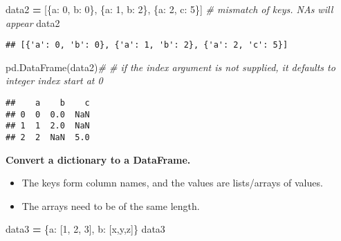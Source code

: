 \documentclass[
]{book}
\newenvironment{Shaded}{\begin{snugshade}}{\end{snugshade}}
\newcommand{\CommentTok}[1]{\textcolor[rgb]{0.56,0.35,0.01}{\textit{#1}}}
\newcommand{\DecValTok}[1]{\textcolor[rgb]{0.00,0.00,0.81}{#1}}
\newcommand{\NormalTok}[1]{#1}
\newcommand{\OperatorTok}[1]{\textcolor[rgb]{0.81,0.36,0.00}{\textbf{#1}}}
\newcommand{\StringTok}[1]{\textcolor[rgb]{0.31,0.60,0.02}{#1}}
\begin{document}
\begin{Shaded}
\begin{Highlighting}[]
\NormalTok{data2 }\OperatorTok{=}\NormalTok{ [\{}\StringTok{\textquotesingle{}a\textquotesingle{}}\NormalTok{: }\DecValTok{0}\NormalTok{, }\StringTok{\textquotesingle{}b\textquotesingle{}}\NormalTok{: }\DecValTok{0}\NormalTok{\},}
\NormalTok{\{}\StringTok{\textquotesingle{}a\textquotesingle{}}\NormalTok{: }\DecValTok{1}\NormalTok{, }\StringTok{\textquotesingle{}b\textquotesingle{}}\NormalTok{: }\DecValTok{2}\NormalTok{\},}
\NormalTok{\{}\StringTok{\textquotesingle{}a\textquotesingle{}}\NormalTok{: }\DecValTok{2}\NormalTok{, }\StringTok{\textquotesingle{}c\textquotesingle{}}\NormalTok{: }\DecValTok{5}\NormalTok{\}] }\CommentTok{\# mismatch of keys. NAs will appear}
\NormalTok{data2}
\end{Highlighting}
\end{Shaded}

\begin{verbatim}
## [{'a': 0, 'b': 0}, {'a': 1, 'b': 2}, {'a': 2, 'c': 5}]
\end{verbatim}

\begin{Shaded}
\begin{Highlighting}[]
\NormalTok{pd.DataFrame(data2)}\CommentTok{\# \# if the index argument is not supplied, it defaults to integer index start at 0}
\end{Highlighting}
\end{Shaded}

\begin{verbatim}
##    a    b    c
## 0  0  0.0  NaN
## 1  1  2.0  NaN
## 2  2  NaN  5.0
\end{verbatim}

\textbf{Convert a dictionary to a DataFrame.}

\begin{itemize}
\item
  The keys form column names, and the values are lists/arrays of values.
\item
  The arrays need to be of the same length.
\end{itemize}

\begin{Shaded}
\begin{Highlighting}[]
\NormalTok{data3 }\OperatorTok{=}\NormalTok{ \{}\StringTok{\textquotesingle{}a\textquotesingle{}}\NormalTok{: [}\DecValTok{1}\NormalTok{, }\DecValTok{2}\NormalTok{, }\DecValTok{3}\NormalTok{], }\StringTok{\textquotesingle{}b\textquotesingle{}}\NormalTok{: [}\StringTok{\textquotesingle{}x\textquotesingle{}}\NormalTok{,}\StringTok{\textquotesingle{}y\textquotesingle{}}\NormalTok{,}\StringTok{\textquotesingle{}z\textquotesingle{}}\NormalTok{]\}}
\NormalTok{data3 }
\end{Highlighting}
\end{Shaded}
\end{document}
